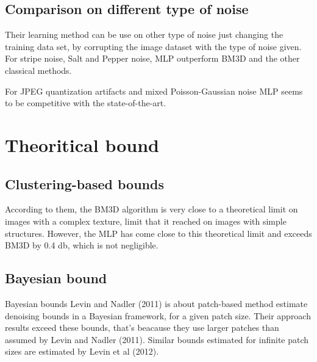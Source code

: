 \documentclass[10pt,a4paper]{article}
\newcommand{\svs}{\vspace{9pt}}
\begin{document}
\svs

\subsection{Comparison on different type of noise}


Their learning method can be use on other type of noise just changing the training data set, by corrupting the image dataset with the type of noise given. For stripe noise, Salt and Pepper noise, MLP outperform BM3D and the other classical methods.

For JPEG quantization artifacts and mixed Poisson-Gaussian noise MLP seems to be competitive with the state-of-the-art.

\section{Theoritical bound}
\subsection{Clustering-based bounds}

According to them, the BM3D algorithm is very close to a theoretical limit on images with a complex texture, limit that it reached on images with simple structures. However, the MLP has come close to this theoretical limit and exceeds BM3D by 0.4 db, which is not negligible.

\subsection{Bayesian bound}

Bayesian bounds Levin and Nadler (2011) is about patch-based method estimate denoising bounds in a Bayesian framework, for a given patch size. Their approach results exceed these bounds, that's beacause they use larger patches than assumed by Levin and Nadler (2011). 
Similar bounds estimated for infinite patch sizes are estimated by Levin et al (2012).
\end{document}
